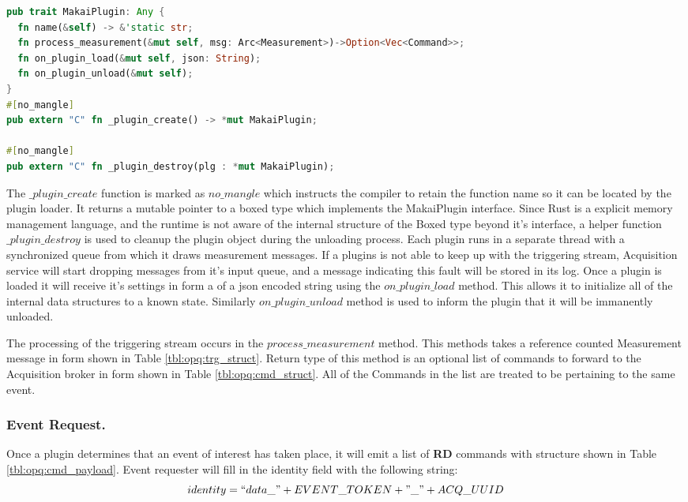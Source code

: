 \begin{lstlisting}[language=Rust, style=colouredRust]
pub trait MakaiPlugin: Any {
  fn name(&self) -> &'static str;
  fn process_measurement(&mut self, msg: Arc<Measurement>)->Option<Vec<Command>>;
  fn on_plugin_load(&mut self, json: String);
  fn on_plugin_unload(&mut self);
}
#[no_mangle]
pub extern "C" fn _plugin_create() -> *mut MakaiPlugin;

#[no_mangle]
pub extern "C" fn _plugin_destroy(plg : *mut MakaiPlugin);
\end{lstlisting}

The $\_plugin\_create$ function is marked as $no\_mangle$ which instructs the compiler to retain the function name so it can be located by the plugin loader.
It returns a mutable pointer to a boxed type which implements the MakaiPlugin interface.
Since Rust is a explicit memory management language, and the runtime is not aware of the internal structure of the Boxed type beyond it's interface,
a helper function $\_plugin\_destroy$ is used to cleanup the plugin object during the unloading process.
Each plugin runs in a separate thread with a synchronized queue from which it draws measurement messages.
If a plugins is not able to keep up with the triggering stream, Acquisition service will start dropping messages from it's input queue,
and a message indicating this fault will be stored in its log.
Once a plugin is loaded it will receive it's settings in form a of a json encoded string using the $on\_plugin\_load$ method.
This allows it to initialize all of the internal data structures to a known state.
Similarly $on\_plugin\_unload$ method is used to inform the plugin that it will be immanently unloaded.

The processing of the triggering stream occurs in the $process\_measurement$ method.
This methods takes a reference counted Measurement message in form shown in Table \ref{tbl:opq:trg_struct}.
Return type of this method is an optional list of commands to forward to the Acquisition broker in form shown in Table \ref{tbl:opq:cmd_struct}.
All of the Commands in the list are treated to be pertaining to the same event.

\subsubsection{Event Request.}
Once a plugin determines that an event of interest has taken place, it will emit a list of \textbf{RD} commands with structure shown in Table \ref{tbl:opq:cmd_payload}.
Event requester will fill in the identity field with the following string:
\[ identity = ``data\_" + EVENT\_TOKEN +"\_" + ACQ\_UUID\]

